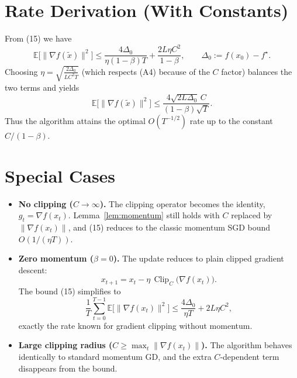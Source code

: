 \documentclass{article}
\begin{document}
\section*{Rate Derivation (With Constants)}
From (15) we have
\[
\mathbb{E}\bigl[\|\nabla f(\tilde{x})\|^2\bigr]
\le
\frac{4\Delta_0}{\eta(1-\beta)T}
+\frac{2L\eta C^2}{1-\beta},
\qquad
\Delta_0:=f(x_0)-f^\star .
\]
Choosing $\eta = \sqrt{\frac{2\Delta_0}{L C^2 T}}$ (which respects (A4) because of the $C$ factor) balances the two terms and yields
\[
\mathbb{E}\bigl[\|\nabla f(\tilde{x})\|^2\bigr]
\le
\frac{4\sqrt{2L\Delta_0}\,C}{(1-\beta)\sqrt{T}} .
\]
Thus the algorithm attains the optimal $O(T^{-1/2})$ rate up to the constant $C/(1-\beta)$.

\section*{Special Cases}
\begin{itemize}
\item \textbf{No clipping ($C\to\infty$).} The clipping operator becomes the identity, $g_t=\nabla f(x_t)$. Lemma~\ref{lem:momentum} still holds with $C$ replaced by $\|\nabla f(x_t)\|$, and (15) reduces to the classic momentum SGD bound $O(1/(\eta T))$.
\item \textbf{Zero momentum ($\beta=0$).} The update reduces to plain clipped gradient descent:
\[
x_{t+1}=x_t-\eta\,\operatorname{Clip}_C\bigl(\nabla f(x_t)\bigr).
\]
The bound (15) simplifies to
\[
\frac{1}{T}\sum_{t=0}^{T-1}\mathbb{E}\bigl[\|\nabla f(x_t)\|^2\bigr]
\le
\frac{4\Delta_0}{\eta T}+2L\eta C^2,
\]
exactly the rate known for gradient clipping without momentum.
\item \textbf{Large clipping radius ($C\ge \max_t\|\nabla f(x_t)\|$).} The algorithm behaves identically to standard momentum GD, and the extra $C$‑dependent term disappears from the bound.
\end{itemize}
\end{document}
